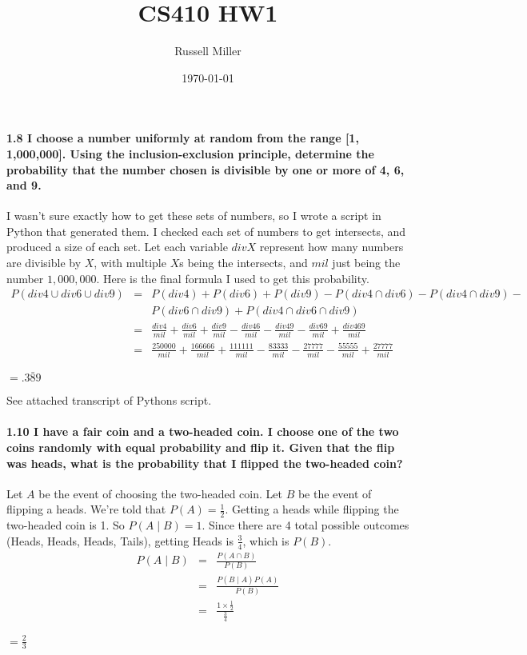 \documentclass{article}
\title{CS410 HW1}
\author{Russell Miller}
\date{\today}
\begin{document}
\maketitle

\paragraph{1.8 I choose a number uniformly at random from the range [1,
1,000,000]. Using the inclusion-exclusion principle, determine the
probability that the number chosen is divisible by one or more of 4, 6, and
9.\\}
I wasn't sure exactly how to get these sets of numbers, so I wrote a
script in Python that generated them. I checked each set of numbers to get
intersects, and produced a size of each set. Let each variable $divX$
represent how many numbers are divisible by $X$, with multiple $X$s being 
the intersects, and $mil$ just being the number $1,000,000$. Here is the 
final formula I used to get this probability.
\begin{eqnarray*}
P(div4 \cup div6 \cup div9) & = & P(div4) + P(div6) + P(div9) - P(div4 \cap
  div6) - P(div4 \cap div9) - \\
      &   & P(div6 \cap div9) + P(div4 \cap div6 \cap 
  div9)\\
      & = & \frac{div4}{mil} + \frac{div6}{mil} + 
  \frac{div9}{mil} - \frac{div46}{mil} - \frac{div49}{mil} - 
  \frac{div69}{mil} + \frac{div469}{mil}\\
      & = & \frac{250000}{mil} + \frac{166666}{mil} + 
  \frac{111111}{mil} - \frac{83333}{mil} - \frac{27777}{mil} - 
  \frac{55555}{mil} + \frac{27777}{mil}
\end{eqnarray*}
\begin{center}
$\boxed{= .3\bar{8}9}$
\end{center}
{\footnotesize See attached transcript of Pythons script.}

\paragraph{1.10 I have a fair coin and a two-headed coin. I choose one of
the two coins randomly with equal probability and flip it. Given that the 
flip was heads, what is the probability that I flipped the two-headed 
coin?\\}
Let $A$ be the event of choosing the two-headed coin. Let $B$ be the event
of flipping a heads. We're told that $P(A) = \frac{1}{2}$. Getting a heads 
while flipping the two-headed coin is 1. So $P(A \mid B) = 1$. Since there
are 4 total possible outcomes (Heads, Heads, Heads, Tails), getting Heads 
is $\frac{3}{4}$, which is $P(B)$.
\begin{eqnarray*}
  P(A \mid B) & = & \frac{P(A \cap B)}{P(B)}\\
              & = & \frac{P(B \mid A)P(A)}{P(B)}\\
              & = & \frac{1 \times \frac{1}{2}}{\frac{3}{4}}
\end{eqnarray*}
\begin{center}
$\boxed{= \frac{2}{3}}$
\end{center}
\end{document}
